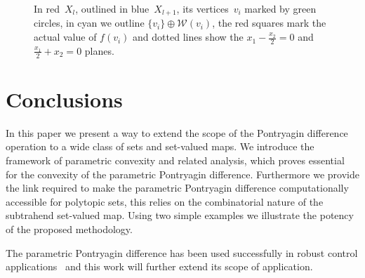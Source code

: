 \documentclass[smallextended]{svjour3}       %
\numberwithin{equation}{section}
\begin{document}
\begin{figure}
\caption{In red~$X_l$, outlined in blue~$X_{l+1}$, its vertices~$v_i$ marked by green circles, in cyan we outline $\{v_i\}\oplus\mathcal W(v_i)$, the red squares mark the actual value of $f(v_i)$ and dotted lines show the $x_1-\frac{x_2}{2}=0$ and $\frac{x_1}{2}+x_2=0$ planes.}
\label{fig:second:example:resulting:set}
\end{figure}
%
%
%
%
%
\section{Conclusions}\label{sec:conclusion}
%
%
%
In this paper we present a way to extend the scope of the Pontryagin
difference operation to a wide class of sets and set-valued maps.
%
We introduce the framework of parametric convexity and related analysis, which proves essential for the convexity of the parametric Pontryagin difference.
%
Furthermore we provide the link required to make the parametric Pontryagin difference computationally accessible for polytopic sets, this relies on the combinatorial nature of the subtrahend set-valued map.
%
Using two simple examples we illustrate the potency of the proposed methodology.

The parametric Pontryagin difference has been used successfully in robust control applications~\cite{Schaich:2015,Schaich:2015a} and this work will further extend its scope of application.



\end{document}
